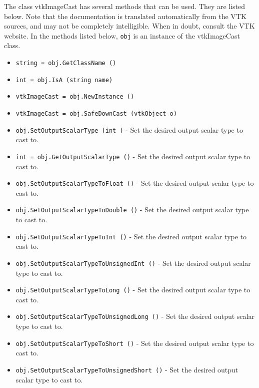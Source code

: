 The class vtkImageCast has several methods that can be used.
  They are listed below.
Note that the documentation is translated automatically from the VTK sources,
and may not be completely intelligible.  When in doubt, consult the VTK website.
In the methods listed below, \verb|obj| is an instance of the vtkImageCast class.
\begin{itemize}
\item  \verb|string = obj.GetClassName ()|

\item  \verb|int = obj.IsA (string name)|

\item  \verb|vtkImageCast = obj.NewInstance ()|

\item  \verb|vtkImageCast = obj.SafeDownCast (vtkObject o)|

\item  \verb|obj.SetOutputScalarType (int )| -  Set the desired output scalar type to cast to.

\item  \verb|int = obj.GetOutputScalarType ()| -  Set the desired output scalar type to cast to.

\item  \verb|obj.SetOutputScalarTypeToFloat ()| -  Set the desired output scalar type to cast to.

\item  \verb|obj.SetOutputScalarTypeToDouble ()| -  Set the desired output scalar type to cast to.

\item  \verb|obj.SetOutputScalarTypeToInt ()| -  Set the desired output scalar type to cast to.

\item  \verb|obj.SetOutputScalarTypeToUnsignedInt ()| -  Set the desired output scalar type to cast to.

\item  \verb|obj.SetOutputScalarTypeToLong ()| -  Set the desired output scalar type to cast to.

\item  \verb|obj.SetOutputScalarTypeToUnsignedLong ()| -  Set the desired output scalar type to cast to.

\item  \verb|obj.SetOutputScalarTypeToShort ()| -  Set the desired output scalar type to cast to.

\item  \verb|obj.SetOutputScalarTypeToUnsignedShort ()| -  Set the desired output scalar type to cast to.


\end{itemize}
